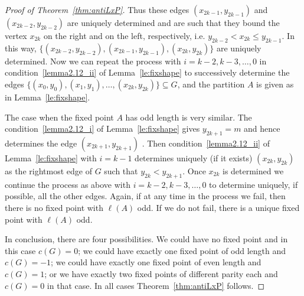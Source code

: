\documentclass[10pt]{amsart}
\theoremstyle{definition}
\begin{document}
\begin{proof}[Proof of Theorem~\ref{thm:antiLxP}]
 Thus these edges $(x_{2k-1},y_{2k-1})$ and $(x_{2k-2},y_{2k-2})$ are uniquely determined and are such that they bound the vertex $x_{2k}$ on the right and on the left, respectively, i.e. $y_{2k-2}<x_{2k}\le y_{2k-1}$.
In this way, $\big\{(x_{2k-2},y_{2k-2}),(x_{2k-1},y_{2k-1}),(x_{2k},y_{2k})\big\}$ are uniquely determined.
 Now we can repeat the process with $i=k-2, k-3,\ldots,0$ in condition~\ref{lemma2.12_ii} 
 of Lemma~\ref{le:fixshape} to successively determine the edges $\big\{(x_0,y_0),(x_1,y_1),\ldots,(x_{2k},y_{2k})\big\}\subseteq G$, and the partition $A$ is given as in Lemma~\ref{le:fixshape}. 
 
 The case when the fixed point $A$ has odd length is very similar. The condition~\ref{lemma2.12_i} of Lemma~\ref{le:fixshape} gives $y_{2k+1}=m$ and hence determines the edge $(x_{2k+1},y_{2k+1})$ . 
Then condition~\ref{lemma2.12_ii} of Lemma~\ref{le:fixshape} with $i=k-1$ determines uniquely (if it exists) $(x_{2k},y_{2k})$ as the rightmost edge of $G$ such that $y_{2k}<y_{2k+1}$. Once $x_{2k}$ is determined
we continue the process as above with $i=k-2, k-3,\ldots,0$ to determine uniquely, if possible, all the other edges. Again, if at any time in the process we fail, then there is no fixed point with $\ell(A)$ odd. If we do not fail, there is a unique fixed point with $\ell(A)$ odd.

In conclusion, there are four possibilities. We could have no fixed point and in this case $c(G)=0$; we could have exactly one fixed point of odd length and $c(G)=-1$; we could have exactly one fixed point of even length and $c(G)=1$; or we have exactly two fixed points of different parity each and $c(G)=0$ in that case. In all cases Theorem~\ref{thm:antiLxP} follows. 
\end{proof}
\end{document}
